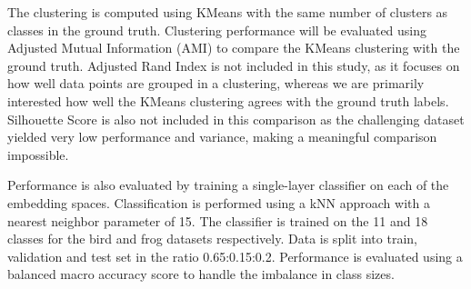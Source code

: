 
The clustering is computed using KMeans with the same number of clusters as classes in the ground truth. 
Clustering performance will be evaluated using Adjusted Mutual Information (AMI) \cite{romano_standardized_2014} to compare the KMeans clustering with the ground truth.
Adjusted Rand Index is not included in this study, as it focuses on how well data points are grouped in a clustering, whereas we are primarily interested how well the KMeans clustering agrees with the ground truth labels.
Silhouette Score is also not included in this comparison as the challenging dataset yielded very low performance and variance, making a meaningful comparison impossible.

Performance is also evaluated by training a single-layer classifier on each of the embedding spaces.
Classification is performed using a kNN approach with a nearest neighbor parameter of 15.
The classifier is trained on the 11 and 18 classes for the bird and frog datasets respectively.
Data is split into train, validation and test set in the ratio 0.65:0.15:0.2.
Performance is evaluated using a balanced macro accuracy score \cite{brodersen_balanced_2010} to handle the imbalance in class sizes.

